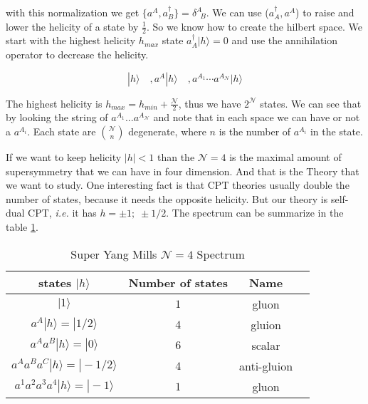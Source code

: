 with this normalization we get $\{a^{A},a^{\dagger}_{B}\}= \delta^{A}_{\;\;B}$. We can use ($a^{\dagger}_{A},a^{A}$) to raise and lower the helicity of a state by $\frac{1}{2}$. So we know how to create the hilbert space. We start with the highest helicity $h_{max}$ state $a^{\dagger}_{A} |h\rangle = 0 $ and use the annihilation operator to decrease the helicity.

\begin{equation}
 |h\rangle  \quad , a^{A} |h\rangle  \quad ,  a^{A_{1}} \cdots a^{A_{\mathcal{N}}} |h\rangle 
\end{equation}

The highest  helicity is $h_{max} = h_{min} + \frac{\mathcal{N}}{2} $, thus we have $2^{\mathcal{N}}$ states. We can see that by looking the string of $a^{A_{1}}...a^{A_{\mathcal{N}}}$ and note that in each space we can have or not a $a^{A_{i}}$. Each state are $\binom {\mathcal{N}} {n}$ degenerate, where $n$ is the number of $a^{A_{i}}$ in the state.



If we want to keep helicity $|h| < 1$ than the $\mathcal{N} = 4$ is the maximal amount of supersymmetry that we can have in four dimension. And that is the Theory that we want to study. One interesting fact is that CPT theories usually double the number of states, because it needs the opposite helicity. But our theory is self-dual CPT, \textit{i.e.} it has $h= \pm 1 ;\;\pm 1/2$. The spectrum can be summarize in the table \ref{Tb.2.1}.

\begin{table}[h!]
  \centering
    \begin{tabular}{ |c|c|c|c } 
   \hline
   states $|h \rangle$								& Number of states 			& Name \\ 
   \hline
   $|1 \rangle $									& $1$ 	& gluon   	\\
   $a^{A}|h \rangle = |1/2 \rangle$ 	   			& $4$ 	& gluion 	\\ 
   $a^{A}a^{B}|h \rangle = |0 \rangle$ 	   			& $6$ 	& scalar 	\\ 
   $a^{A}a^{B}a^{C}|h \rangle = |-1/2 \rangle$ 		& $4$ 	& anti-gluion 	\\ 
   $a^{1}a^{2}a^{3}a^{4}|h \rangle = |-1 \rangle$ 	& $1$ 	& gluon 	\\ 
 \hline
  
  \end{tabular}
 \caption{Super Yang Mills $\mathcal{N} =4$ Spectrum }
   \label{Tb.2.1}
	\end{table}
	
